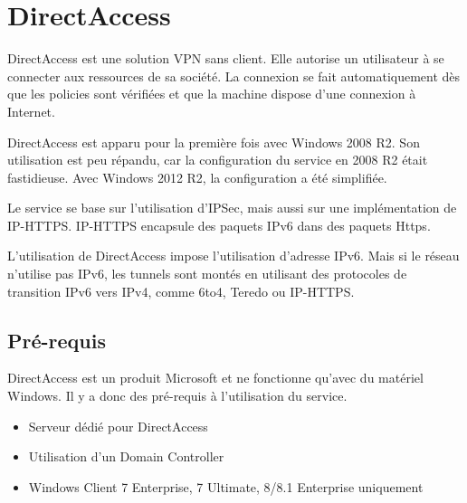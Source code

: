 \section{DirectAccess}
DirectAccess est une solution VPN sans client. 
Elle autorise un utilisateur à se connecter aux ressources de sa société.
La connexion se fait automatiquement dès que les policies sont vérifiées et que la machine dispose d'une connexion à Internet.

DirectAccess est apparu pour la première fois avec Windows 2008 R2.
Son utilisation est peu répandu, car la configuration du service en 2008 R2 était fastidieuse. 
Avec Windows 2012 R2, la configuration a été simplifiée.

Le service se base sur l'utilisation d'IPSec, mais aussi sur une implémentation de IP-HTTPS.
IP-HTTPS encapsule des paquets IPv6 dans des paquets Https. 

L'utilisation de DirectAccess impose l'utilisation d'adresse IPv6.
Mais si le réseau n'utilise pas IPv6, les tunnels sont montés en utilisant des protocoles de transition IPv6 vers IPv4, comme 6to4, Teredo ou IP-HTTPS.

\subsection{Pré-requis}
DirectAccess est un produit Microsoft et ne fonctionne qu'avec du matériel Windows.
Il y a donc des pré-requis à l'utilisation du service.
\begin{itemize}
	\item Serveur dédié pour DirectAccess
	\item Utilisation d'un Domain Controller
	\item Windows Client 7 Enterprise, 7 Ultimate, 8/8.1 Enterprise uniquement
\end{itemize}
